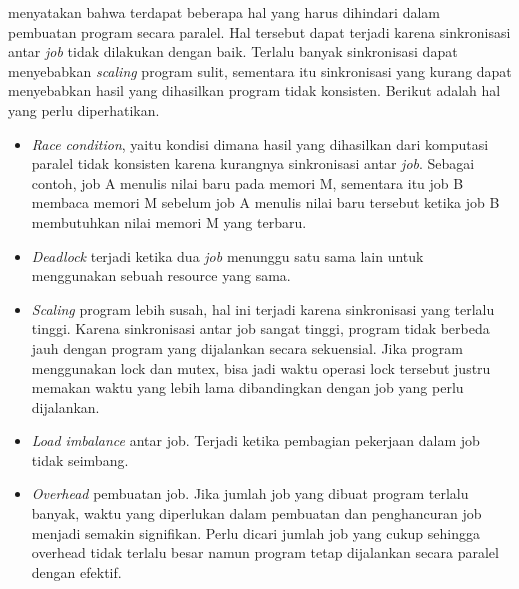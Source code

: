 \citep{structured_parallel_programming} menyatakan bahwa terdapat beberapa hal yang harus dihindari dalam pembuatan program secara paralel. Hal tersebut dapat terjadi karena sinkronisasi antar \textit{job} tidak dilakukan dengan baik. Terlalu banyak sinkronisasi dapat menyebabkan \textit{scaling} program sulit, sementara itu sinkronisasi yang kurang dapat menyebabkan hasil yang dihasilkan program tidak konsisten. Berikut adalah hal yang perlu diperhatikan.
\begin{itemize}
  \item \textit{Race condition}, yaitu kondisi dimana hasil yang dihasilkan dari komputasi paralel tidak konsisten karena kurangnya sinkronisasi antar \textit{job}. Sebagai contoh, job A menulis nilai baru pada memori M, sementara itu job B membaca memori M sebelum job A menulis nilai baru tersebut ketika job B membutuhkan nilai memori M yang terbaru.
  \item \textit{Deadlock} terjadi ketika dua \textit{job} menunggu satu sama lain untuk menggunakan sebuah resource yang sama.
  \item \textit{Scaling} program lebih susah, hal ini terjadi karena sinkronisasi yang terlalu tinggi. Karena sinkronisasi antar job sangat tinggi, program tidak berbeda jauh dengan program yang dijalankan secara sekuensial. Jika program menggunakan lock dan mutex, bisa jadi waktu operasi lock tersebut justru memakan waktu yang lebih lama dibandingkan dengan job yang perlu dijalankan.
  \item \textit{Load imbalance} antar job. Terjadi ketika pembagian pekerjaan dalam job tidak seimbang.  
  \item \textit{Overhead} pembuatan job. Jika jumlah job yang dibuat program terlalu banyak, waktu yang diperlukan dalam pembuatan dan penghancuran job menjadi semakin signifikan. Perlu dicari jumlah job yang cukup sehingga overhead tidak terlalu besar namun program tetap dijalankan secara paralel dengan efektif.
\end{itemize}
